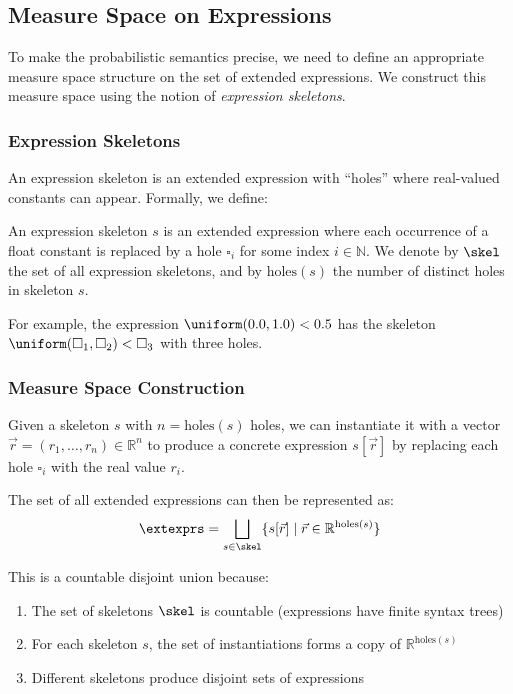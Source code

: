 \subsection{Measure Space on Expressions}

To make the probabilistic semantics precise, we need to define an appropriate measure space structure on the set of extended expressions. We construct this measure space using the notion of \emph{expression skeletons}.

\subsubsection{Expression Skeletons}

An expression skeleton is an extended expression with ``holes'' where real-valued constants can appear. Formally, we define:

\begin{definition}
An expression skeleton $s$ is an extended expression where each occurrence of a float constant is replaced by a hole $\square_i$ for some index $i \in \mathbb{N}$. We denote by $\skel$ the set of all expression skeletons, and by $\text{holes}(s)$ the number of distinct holes in skeleton $s$.
\end{definition}

For example, the expression $\uniform(0.0, 1.0) < 0.5$ has the skeleton $\uniform(\square_1, \square_2) < \square_3$ with three holes.

\subsubsection{Measure Space Construction}

Given a skeleton $s$ with $n = \text{holes}(s)$ holes, we can instantiate it with a vector $\vec{r} = (r_1, \ldots, r_n) \in \mathbb{R}^n$ to produce a concrete expression $s[\vec{r}]$ by replacing each hole $\square_i$ with the real value $r_i$.

The set of all extended expressions can then be represented as:
\[
\extexprs = \bigsqcup_{s \in \skel} \{s[\vec{r}] \mid \vec{r} \in \mathbb{R}^{\text{holes}(s)}\}
\]

This is a countable disjoint union because:
\begin{enumerate}
    \item The set of skeletons $\skel$ is countable (expressions have finite syntax trees)
    \item For each skeleton $s$, the set of instantiations forms a copy of $\mathbb{R}^{\text{holes}(s)}$
    \item Different skeletons produce disjoint sets of expressions
\end{enumerate}


